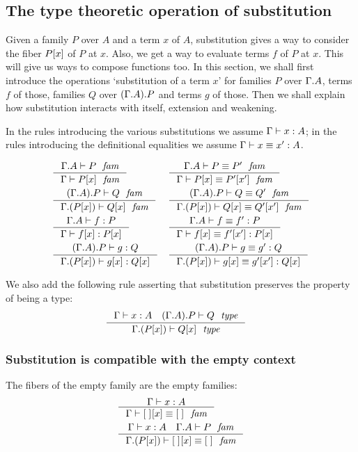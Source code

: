 \subsection{The type theoretic operation of substitution}
Given a family $P$ over $A$ and a term $x$ of $A$, substitution gives a way to
consider the fiber $\subst{x}{P}$ of $P$ at $x$. Also, we get a way to evaluate
terms $f$ of $P$ at $x$. This will give us ways to compose functions too. In
this section, we shall first introduce the operations `substitution of a term $x$'
for families $P$ over $\ctxext{\Gamma}{A}$, terms $f$ of those, families $Q$ over
$\ctxext{{\Gamma}{A}}{P}$ and terms $g$ of those. 
Then we shall explain how substitution interacts
with itself, extension and weakening.

In the rules introducing the various substitutions we assume $\jterm{\Gamma}{A}{x}$;
in the rules introducing the definitional equalities we assume $\jtermeq{\Gamma}{A}{x}{x'}$.

\begin{align}
& \inference{\jfam{{\Gamma}{A}}{P}}{\jfam{\Gamma}{\subst{x}{P}}}
& & \inference{\jfameq{{\Gamma}{A}}{P}{P'}}{\jfameq{\Gamma}{\subst{x}{P}}{\subst{x'}{P'}}}\\
& \inference{\jfam{{{\Gamma}{A}}{P}}{Q}}{\jfam{{\Gamma}{\subst{x}{P}}}{\subst{x}{Q}}}
& & \inference{\jfameq{{{\Gamma}{A}}{P}}{Q}{Q'}}{\jfameq{{\Gamma}{\subst{x}{P}}}{\subst{x}{Q}}{\subst{x'}{Q'}}}\\
& \inference{\jterm{{\Gamma}{A}}{P}{f}}{\jterm{\Gamma}{\subst{x}{P}}{\subst{x}{f}}}
& & \inference{\jtermeq{{\Gamma}{A}}{P}{f}{f'}}{\jtermeq{\Gamma}{\subst{x}{P}}{\subst{x}{f}}{\subst{x'}{f'}}}\\
& \inference{\jterm{{{\Gamma}{A}}{P}}{Q}{g}}{\jterm{{\Gamma}{\subst{x}{P}}}{\subst{x}{Q}}{\subst{x}{g}}}
& &\inference{\jtermeq{{{\Gamma}{A}}{P}}{Q}{g}{g'}}{\jtermeq{{\Gamma}{\subst{x}{P}}}{\subst{x}{Q}}{\subst{x}{g}}{\subst{x'}{g'}}}
\end{align}

We also add the following rule asserting that substitution preserves the
property of being a type:
\begin{align}
& \inference{\jterm{\Gamma}{A}{x}\quad\jtype{\ctxext{{\Gamma}{A}}{P}}{Q}}{\jtype{\ctxext{\Gamma}{\subst{x}{P}}}{\subst{x}{Q}}}
\end{align}

\subsubsection{Substitution is compatible with the empty context}
The fibers of the empty family are the empty families:
\begin{align}
& \inference{\jterm{\Gamma}{A}{x}}{\jfameq{\Gamma}{\subst{x}{\emptyf}}{\emptyf}}\\
& \inference{\jterm{\Gamma}{A}{x}\quad\jfam{{\Gamma}{A}}{P}}{\jfameq{{\Gamma}{\subst{x}{P}}}{\subst{x}{\emptyf}}{\emptyf}}
\end{align}

